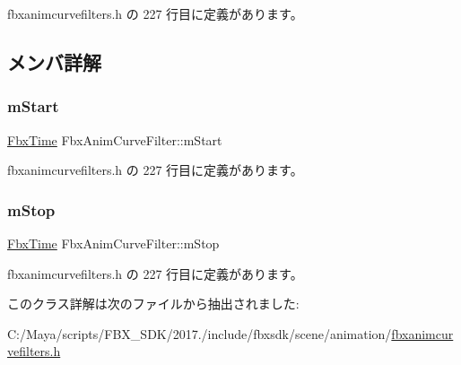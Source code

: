  fbxanimcurvefilters.\+h の 227 行目に定義があります。



\subsection{メンバ詳解}
\mbox{\label{class_fbx_anim_curve_filter_afb8079a673486763ec97bea38641bc54}} 
\subsubsection{\texorpdfstring{m\+Start}{mStart}}
{\footnotesize\ttfamily \hyperlink{class_fbx_time}{Fbx\+Time} Fbx\+Anim\+Curve\+Filter\+::m\+Start\hspace{0.3cm}{\ttfamily [protected]}}



 fbxanimcurvefilters.\+h の 227 行目に定義があります。

\mbox{\label{class_fbx_anim_curve_filter_ad3be4640799f960d1910a2e3132e82eb}} 
\subsubsection{\texorpdfstring{m\+Stop}{mStop}}
{\footnotesize\ttfamily \hyperlink{class_fbx_time}{Fbx\+Time} Fbx\+Anim\+Curve\+Filter\+::m\+Stop\hspace{0.3cm}{\ttfamily [protected]}}



 fbxanimcurvefilters.\+h の 227 行目に定義があります。



このクラス詳解は次のファイルから抽出されました\+:\begin{DoxyCompactItemize}
\item 
C\+:/\+Maya/scripts/\+F\+B\+X\+\_\+\+S\+D\+K/2017./include/fbxsdk/scene/animation/\hyperlink{fbxanimcurvefilters_8h}{fbxanimcurvefilters.\+h}\end{DoxyCompactItemize}
